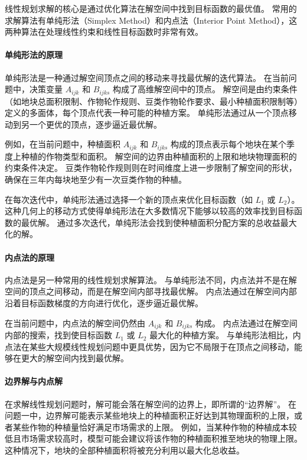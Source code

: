 \documentclass[12pt,a4paper]{nmmcm}
\begin{document}
线性规划求解的核心是通过优化算法在解空间中找到目标函数的最优值。
常用的求解算法有单纯形法（Simplex Method）和内点法（Interior Point Method），这两种算法在处理线性约束和线性目标函数时非常有效。


\paragraph{单纯形法的原理}

单纯形法是一种通过解空间顶点之间的移动来寻找最优解的迭代算法。
在当前问题中，决策变量 $A_{ijk}$ 和 $B_{ijks}$ 构成了高维解空间中的顶点。
解空间是由约束条件（如地块总面积限制、作物轮作规则、豆类作物轮作要求、最小种植面积限制等）定义的多面体，每个顶点代表一种可能的种植方案。
单纯形法通过从一个顶点移动到另一个更优的顶点，逐步逼近最优解。


例如，在当前问题中，种植面积 $A_{ijk}$ 和 $B_{ijks}$ 构成的顶点表示每个地块在某个季度上种植的作物类型和面积。
解空间的边界由种植面积的上限和地块物理面积的约束条件决定。
豆类作物轮作规则则在时间维度上进一步限制了解空间的形状，确保在三年内每块地至少有一次豆类作物的种植。


在每次迭代中，单纯形法通过选择一个新的顶点来优化目标函数（如 $L_1$ 或 $L_2$）。
这种几何上的移动方式使得单纯形法在大多数情况下能够以较高的效率找到目标函数的最优解。
通过多次迭代，单纯形法会找到使种植面积分配方案的总收益最大化的解。


\paragraph{内点法的原理}

内点法是另一种常用的线性规划求解算法。
与单纯形法不同，内点法并不是在解空间的顶点之间移动，而是在解空间内部寻找最优解。
内点法通过在解空间内部沿着目标函数梯度的方向进行优化，逐步逼近最优解。


在当前问题中，内点法的解空间仍然由 $A_{ijk}$ 和 $B_{ijks}$ 构成。
内点法通过在解空间内部的搜索，找到使目标函数 $L_1$ 或 $L_2$ 最大化的种植方案。
与单纯形法相比，内点法在某些大规模线性规划问题中更具优势，因为它不局限于在顶点之间移动，能够在更大的解空间内找到最优解。


\paragraph{边界解与内点解}

在求解线性规划问题时，解可能会落在解空间的边界上，即所谓的“边界解”。
在问题一中，边界解可能表示某些地块上的种植面积正好达到其物理面积的上限，或者某些作物的种植量恰好满足市场需求的上限。
例如，当某种作物的种植成本较低且市场需求较高时，模型可能会建议将该作物的种植面积推至地块的物理上限。
这种情况下，地块的全部种植面积将被充分利用以最大化总收益。
\end{document}
